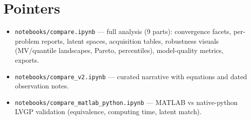 \documentclass[11pt]{article}
\begin{document}
\section*{Pointers}
\begin{itemize}
\item \texttt{notebooks/compare.ipynb} --- full analysis (9 parts): convergence facets,
      per-problem reports, latent spaces, acquisition tables, robustness visuals
      (MV/quantile landscapes, Pareto, percentiles), model-quality metrics, exports.
\item \texttt{notebooks/compare\_v2.ipynb} --- curated narrative with equations and dated
      observation notes.
\item \texttt{notebooks/compare\_matlab\_python.ipynb} --- MATLAB vs native-python LVGP
      validation (equivalence, computing time, latent match).
\end{itemize}
\end{document}
